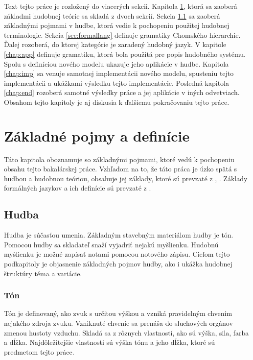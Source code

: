 Text tejto práce je rozložený do viacerých sekcii. Kapitola \ref{chap:definitions}, ktorá sa zaoberá základmi hudobnej teórie sa skladá z dvoch sekcií. Sekcia \ref{sec:music} sa zaoberá základnými pojmami v hudbe, ktorá vedie k pochopeniu použitej hudobnej terminologie. Sekcia \ref{sec:formallang} definuje gramatiky Chomského hierarchie. Ďalej rozoberá, do ktorej kategórie je zaradený hudobný jazyk. V kapitole \ref{chap:app} definuje gramatiku, ktorá bola použitá pre popis hudobného systému. Spolu s definíciou nového modelu ukazuje jeho aplikácie v hudbe. Kapitola \ref{chap:imp} sa venuje samotnej implementácii nového modelu, spusteniu tejto implementácii a ukážkami výsledku tejto implementácie. Posledná kapitola \ref{chap:end} rozoberá samotné výsledky práce a jej aplikácie v iných odvetviach. Obsahom tejto kapitoly je aj diskusia k ďalšiemu pokračovaniu tejto práce. 


\chapter{Základné pojmy a definície}
\label{chap:definitions}
Táto kapitola oboznamuje so základnými pojmami, ktoré vedú k pochopeniu obsahu tejto bakalárskej práce. Vzhľadom na to, že táto práca je úzko spätá s hudbou a hudobnou teóriou, obsahuje jej základy, ktoré sú prevzaté z \cite{MUSICTHEORY}, \cite{DunnettVar}. Základy formálných jazykov a ich definície sú prevzaté z \cite{MEDUNATHEORY}.

\section{Hudba}
\label{sec:music}
Hudba je súčasťou umenia. Základným stavebným materiálom hudby je tón. Pomocou hudby sa skladateľ snaží vyjadriť nejakú myšlienku. Hudobnú myšlienku je možné zapísať notami pomocou notového zápisu. Cieľom tejto podkapitoly je objasnenie základných pojmov hudby, ako i ukážka hudobnej štruktúry téma a variácie.

\subsection{Tón}
Tón je definovaný, ako zvuk s určitou výškou a vzniká pravidelným chvením nejakého zdroja zvuku. Vzniknuté chvenie sa prenáša do sluchových orgánov zmenou hustoty vzduchu. Skladá sa z rôznych vlastností, ako sú výška, sila, farba a dĺžka. Najdôležitejšie vlastnosti sú výška tónu a jeho dĺžka, ktoré sú predmetom tejto práce.

